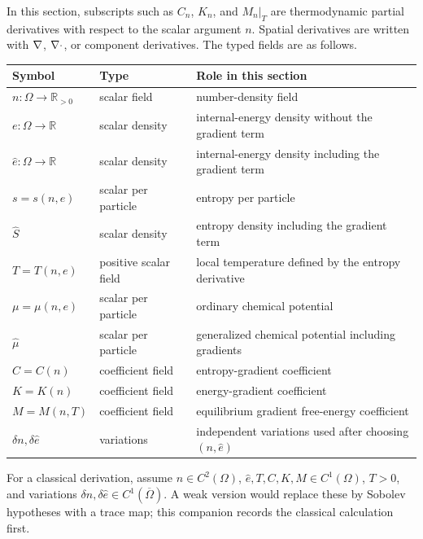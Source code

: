 In this section, subscripts such as \(C_n\), \(K_n\), and \(M_n|_T\) are
thermodynamic partial derivatives with respect to the scalar argument \(n\).
Spatial derivatives are written with \(\nabla\), \(\nabla\cdot\), or component
derivatives.  The typed fields are as follows.

\begin{center}
\begin{tabular}{@{}lll@{}}
\toprule
Symbol & Type & Role in this section \\
\midrule
\(n:\Omega\to\mathbb{R}_{>0}\) & scalar field & number-density field \\
\(e:\Omega\to\mathbb{R}\) & scalar density & internal-energy density without the gradient term \\
\(\hat e:\Omega\to\mathbb{R}\) & scalar density & internal-energy density including the gradient term \\
\(s=s(n,e)\) & scalar per particle & entropy per particle \\
\(\hat S\) & scalar density & entropy density including the gradient term \\
\(T=T(n,e)\) & positive scalar field & local temperature defined by the entropy derivative \\
\(\mu=\mu(n,e)\) & scalar per particle & ordinary chemical potential \\
\(\hat\mu\) & scalar per particle & generalized chemical potential including gradients \\
\(C=C(n)\) & coefficient field & entropy-gradient coefficient \\
\(K=K(n)\) & coefficient field & energy-gradient coefficient \\
\(M=M(n,T)\) & coefficient field & equilibrium gradient free-energy coefficient \\
\(\delta n,\delta\hat e\) & variations & independent variations used after choosing \((n,\hat e)\) \\
\bottomrule
\end{tabular}
\end{center}

For a classical derivation, assume \(n\in C^2(\Omega)\),
\(\hat e,T,C,K,M\in C^1(\Omega)\), \(T>0\), and variations
\(\delta n,\delta\hat e\in C^1(\overline{\Omega})\).  A weak version would
replace these by Sobolev hypotheses with a trace map; this companion records
the classical calculation first.


